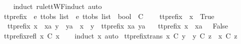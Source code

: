 %
\isadelimproof
\ \ %
\endisadelimproof
%
\isatagproof
{}\isamarkupfalse%
\ {\isacharparenleft}induct\ rule{\isacharcolon}ttWF{}{\isachardot}induct{\isacharcomma}\ auto{\isacharparenright}%
\endisatagproof
{\isafoldproof}%
%
\isadelimproof
%
\endisadelimproof
%
\isadelimdocument
%
\endisadelimdocument
%
\isatagdocument
%
\isamarkuptrue%
%
\isamarkuptrue%
%
\endisatagdocument
{\isafolddocument}%
%
\isadelimdocument
%
\endisadelimdocument
{}\isamarkupfalse%
\ tt{\isacharunderscore}prefix\ {\isacharcolon}{\isacharcolon}\ {\isachardoublequoteopen}{\isacharprime}e\ ttobs\ list\ {\isasymRightarrow}\ {\isacharprime}e\ ttobs\ list\ {\isasymRightarrow}\ bool{\isachardoublequoteclose}\ {\isacharparenleft}\ {\isachardoublequoteopen}{\isasymle}\isactrlsub C{\isachardoublequoteclose}\ {}{}{\isacharparenright}\ \isanewline
\ \ {\isachardoublequoteopen}tt{\isacharunderscore}prefix\ {\isacharbrackleft}{\isacharbrackright}\ x\ {\isacharequal}\ True{\isachardoublequoteclose}\ {\isacharbar}\isanewline
\ \ {\isachardoublequoteopen}tt{\isacharunderscore}prefix\ {\isacharparenleft}x\ {\isacharhash}\ xa{\isacharparenright}\ {\isacharparenleft}y\ {\isacharhash}\ ya{\isacharparenright}\ {\isacharequal}\ {\isacharparenleft}x\ {\isacharequal}\ y\ {\isasymand}\ tt{\isacharunderscore}prefix\ xa\ ya{\isacharparenright}{\isachardoublequoteclose}\ {\isacharbar}\isanewline
\ \ {\isachardoublequoteopen}tt{\isacharunderscore}prefix\ {\isacharparenleft}x\ {\isacharhash}\ xa{\isacharparenright}\ {\isacharbrackleft}{\isacharbrackright}\ {\isacharequal}\ False{\isachardoublequoteclose}\isanewline
\isanewline
{}\isamarkupfalse%
\ tt{\isacharunderscore}prefix{\isacharunderscore}refl{\isacharcolon}\ {\isachardoublequoteopen}x\ {\isasymle}\isactrlsub C\ x{\isachardoublequoteclose}\isanewline
%
\isadelimproof
\ \ %
\endisadelimproof
%
\isatagproof
{}\isamarkupfalse%
\ {\isacharparenleft}induct\ x{\isacharcomma}\ auto{\isacharparenright}%
\endisatagproof
{\isafoldproof}%
%
\isadelimproof
\isanewline
%
\endisadelimproof
\isanewline
{}\isamarkupfalse%
\ tt{\isacharunderscore}prefix{\isacharunderscore}trans{\isacharcolon}\ {\isachardoublequoteopen}x\ {\isasymle}\isactrlsub C\ y\ {\isasymLongrightarrow}\ y\ {\isasymle}\isactrlsub C\ z\ {\isasymLongrightarrow}\ x\ {\isasymle}\isactrlsub C\ z{\isachardoublequoteclose}\isanewline
%
\isadelimproof
%
\endisadelimproof
%
\isatagproof
{}\isamarkupfalse%
